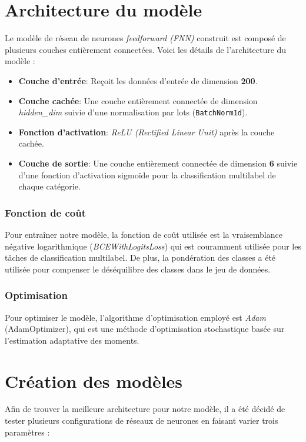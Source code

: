 \section{Architecture du modèle}

Le modèle de réseau de neurones \textit{feedforward (FNN)} construit est composé de plusieurs couches entièrement connectées. Voici les détails de l'architecture du modèle :
\begin{itemize}
    \item \textbf{Couche d'entrée}: Reçoit les données d'entrée de dimension \textbf{200}.
    \item \textbf{Couche cachée}: Une couche entièrement connectée de dimension \textit{hidden\_dim} suivie d'une normalisation par lots (\texttt{BatchNorm1d}).
    \item \textbf{Fonction d'activation}: \textit{ReLU (Rectified Linear Unit)} après la couche cachée.
    \item \textbf{Couche de sortie}: Une couche entièrement connectée de dimension \textbf{6} suivie d'une fonction d'activation sigmoïde pour la classification multilabel de chaque catégorie.
\end{itemize}

\subsubsection{Fonction de coût}

Pour entraîner notre modèle, la fonction de coût utilisée est la vraisemblance négative logarithmique (\textit{BCEWithLogitsLoss}) qui est couramment utilisée pour les tâches de classification multilabel.
De plus, la pondération des classes a été utilisée pour compenser le déséquilibre des classes dans le jeu de données.
\subsubsection{Optimisation}

Pour optimiser le modèle, l'algorithme d'optimisation employé est \textit{Adam} (AdamOptimizer), qui est une méthode d'optimisation stochastique basée sur l'estimation adaptative des moments.

\section{Création des modèles}

Afin de trouver la meilleure architecture pour notre modèle, il a été décidé de tester plusieurs configurations de réseaux de neurones en faisant varier trois paramètres :

